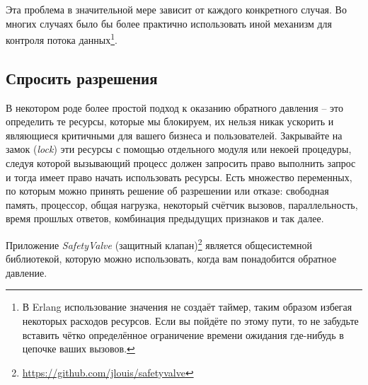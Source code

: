 \documentclass[11pt, oneside]{book}   	%
\begin{document}
Эта проблема в значительной мере зависит от каждого конкретного случая. Во многих случаях было бы более практично использовать иной механизм для контроля потока данных\footnote{В Erlang использование значения  не создаёт таймер, таким образом избегая некоторых расходов ресурсов. Если вы пойдёте по этому пути, то не забудьте вставить чётко определённое ограничение времени ожидания где-нибудь в цепочке ваших вызовов.}.


\subsection{Спросить разрешения}

В некотором роде более простой подход к оказанию обратного давления -- это определить те ресурсы, которые мы блокируем, их нельзя никак ускорить и являющиеся критичными для вашего бизнеса и пользователей. Закрывайте на замок (\emph{lock}) эти ресурсы с помощью отдельного модуля или некоей процедуры, следуя которой вызывающий процесс должен запросить право выполнить запрос и тогда имеет право начать использовать ресурсы. Есть множество переменных, по которым можно принять решение об разрешении или отказе: свободная память, процессор, общая нагрузка, некоторый счётчик вызовов, параллельность, время прошлых ответов, комбинация предыдущих признаков и так далее.

Приложение \emph{SafetyValve} (защитный клапан)\footnote{\href{https://github.com/jlouis/safetyvalve}{https://github.com/jlouis/safetyvalve}} является общесистемной библиотекой, которую можно использовать, когда вам понадобится обратное давление.
\end{document}
